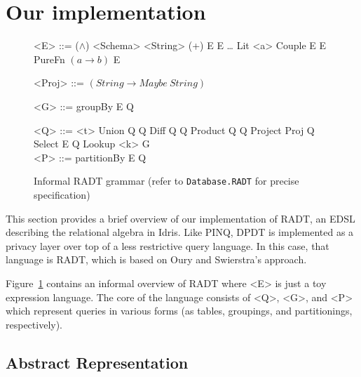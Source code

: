 \documentclass[12pt]{report}
\begin{document}
\section{Our implementation}

\begin{figure}[H]
\begin{mdframed}
\begin{minipage}[t]{0.5\textwidth}
  \begin{grammar}
    <E> ::= \phantom
    \alt ($\land$) <Schema> <String>
    \alt (+) E E
    \alt \ldots
    \alt Lit <a>
    \alt Couple E E
    \alt PureFn $(a \rightarrow b)$ E

    <Proj> ::= $(String \rightarrow Maybe\ String)$

    <G> ::= \phantom
    \alt groupBy E Q
  \end{grammar}
\end{minipage} %
\begin{minipage}[t]{0.5\textwidth}
  \begin{grammar}
    <Q> ::= \phantom
    \alt <t>
    \alt Union Q Q
    \alt Diff Q Q
    \alt Product Q Q
    \alt Project Proj Q
    \alt Select E Q
    \alt Lookup <k> G
    \\

    <P> ::= \phantom
    \alt partitionBy E Q
  \end{grammar}
\end{minipage}
\end{mdframed}
\caption{Informal RADT grammar (refer to \texttt{Database.RADT} for precise specification)}
\label{gram:radt}
\end{figure}

This section provides a brief overview of our implementation of RADT, an EDSL describing the relational algebra in Idris.
Like PINQ, DPDT is implemented as a privacy layer over top of a less restrictive query language.
In this case, that language is RADT, which is based on Oury and Swierstra's approach\cite{OurySwierstra08PowerOfPi}.

Figure~\ref{gram:radt} contains an informal overview of RADT where <E> is just a toy expression language.
The core of the language consists of <Q>, <G>, and <P> which represent queries in various forms (as tables, groupings, and partitionings, respectively).

\subsection{Abstract Representation}
\end{document}
